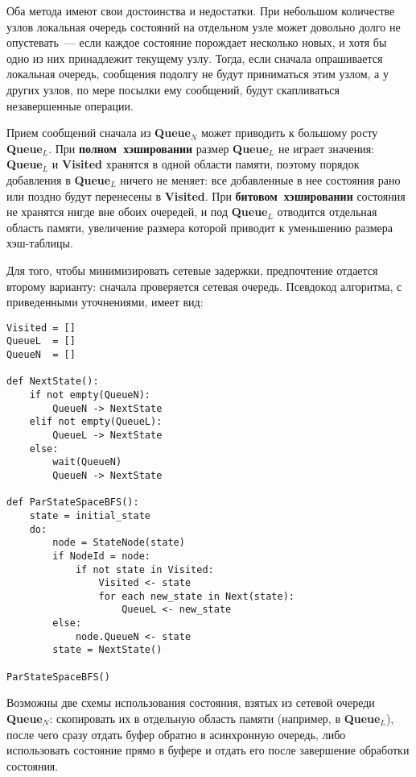 \documentclass[12pt,a4paper,fleqn]{article}
\newcommand{\Code}[1]{\textbf{\mbox{#1}}}
\begin{document}
Оба метода имеют свои достоинства и недостатки. При небольшом количестве узлов локальная очередь
состояний на отдельном узле может довольно долго не опустевать~--- если каждое состояние порождает
несколько новых, и хотя бы одно из них принадлежит текущему узлу. Тогда, если сначала опрашивается
локальная очередь, сообщения подолгу не будут приниматься этим узлом, а у других узлов, по мере
посылки ему сообщений, будут скапливаться незавершенные операции.

Прием сообщений сначала из \Code{Queue$_N$} может приводить к большому росту \Code{Queue$_L$}. При
\Code{полном хэшировании} размер \Code{Queue$_L$} не играет значения: \Code{Queue$_L$} и
\Code{Visited} хранятся в одной области памяти, поэтому порядок добавления в \Code{Queue$_L$} ничего
не меняет: все добавленные в нее состояния рано или поздно будут перенесены в \Code{Visited}. При
\Code{битовом хэшировании} состояния не хранятся нигде вне обоих очередей, и под \Code{Queue$_L$}
отводится отдельная область памяти, увеличение размера которой приводит к уменьшению размера
хэш-таблицы.

Для того, чтобы минимизировать сетевые задержки, предпочтение отдается второму варианту: сначала
проверяется сетевая очередь. Псевдокод алгоритма, с приведенными уточнениями, имеет вид:

\begin{lstlisting}[style=pseudocode]
Visited = []
QueueL  = []
QueueN  = []

def NextState():
    if not empty(QueueN):
        QueueN -> NextState
    elif not empty(QueueL):
        QueueL -> NextState
    else:
        wait(QueueN)
        QueueN -> NextState

def ParStateSpaceBFS():
    state = initial_state
    do:
        node = StateNode(state)
        if NodeId = node:
            if not state in Visited:
                Visited <- state
                for each new_state in Next(state):
                    QueueL <- new_state
        else:
            node.QueueN <- state
        state = NextState()

ParStateSpaceBFS()
\end{lstlisting}

Возможны две схемы использования состояния, взятых из сетевой очереди \Code{Queue$_N$}: скопировать
их в отдельную область памяти (например, в \Code{Queue$_L$}), после чего сразу отдать буфер обратно
в асинхронную очередь, либо использовать состояние прямо в буфере и отдать его после завершение
обработки состояния.
\end{document}
